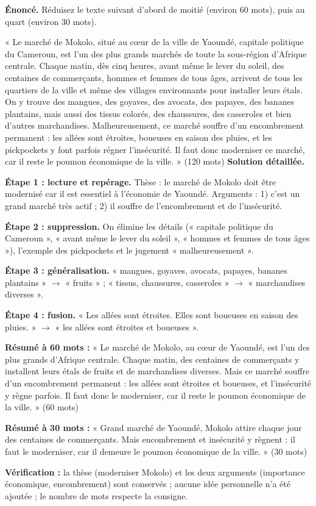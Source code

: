 \documentclass[11pt]{article}
\begin{document}
\begin{exoresolu}
\textbf{Énoncé.} Réduisez le texte suivant d'abord de moitié (environ 60 mots), puis au quart (environ 30 mots).

« Le marché de Mokolo, situé au cœur de la ville de Yaoundé, capitale politique du Cameroun, est l'un des plus grands marchés de toute la sous-région d'Afrique centrale. Chaque matin, dès cinq heures, avant même le lever du soleil, des centaines de commerçants, hommes et femmes de tous âges, arrivent de tous les quartiers de la ville et même des villages environnants pour installer leurs étals. On y trouve des mangues, des goyaves, des avocats, des papayes, des bananes plantains, mais aussi des tissus colorés, des chaussures, des casseroles et bien d'autres marchandises. Malheureusement, ce marché souffre d'un encombrement permanent : les allées sont étroites, boueuses en saison des pluies, et les pickpockets y font parfois régner l'insécurité. Il faut donc moderniser ce marché, car il reste le poumon économique de la ville. » (120 mots)
\tcblower
\textbf{Solution détaillée.}

\textbf{Étape 1 : lecture et repérage.} Thèse : le marché de Mokolo doit être modernisé car il est essentiel à l'économie de Yaoundé. Arguments : 1) c'est un grand marché très actif ; 2) il souffre de l'encombrement et de l'insécurité.

\textbf{Étape 2 : suppression.} On élimine les détails (« capitale politique du Cameroun », « avant même le lever du soleil », « hommes et femmes de tous âges »), l'exemple des pickpockets et le jugement « malheureusement ».

\textbf{Étape 3 : généralisation.} « mangues, goyaves, avocats, papayes, bananes plantains » $\rightarrow$ « fruits » ; « tissus, chaussures, casseroles » $\rightarrow$ « marchandises diverses ».

\textbf{Étape 4 : fusion.} « Les allées sont étroites. Elles sont boueuses en saison des pluies. » $\rightarrow$ « les allées sont étroites et boueuses ».

\textbf{Résumé à 60 mots :} « Le marché de Mokolo, au cœur de Yaoundé, est l'un des plus grands d'Afrique centrale. Chaque matin, des centaines de commerçants y installent leurs étals de fruits et de marchandises diverses. Mais ce marché souffre d'un encombrement permanent : les allées sont étroites et boueuses, et l'insécurité y règne parfois. Il faut donc le moderniser, car il reste le poumon économique de la ville. » (60 mots)

\textbf{Résumé à 30 mots :} « Grand marché de Yaoundé, Mokolo attire chaque jour des centaines de commerçants. Mais encombrement et insécurité y règnent : il faut le moderniser, car il demeure le poumon économique de la ville. » (30 mots)

\textbf{Vérification :} la thèse (moderniser Mokolo) et les deux arguments (importance économique, encombrement) sont conservés ; aucune idée personnelle n'a été ajoutée ; le nombre de mots respecte la consigne.
\end{exoresolu}
\end{document}

